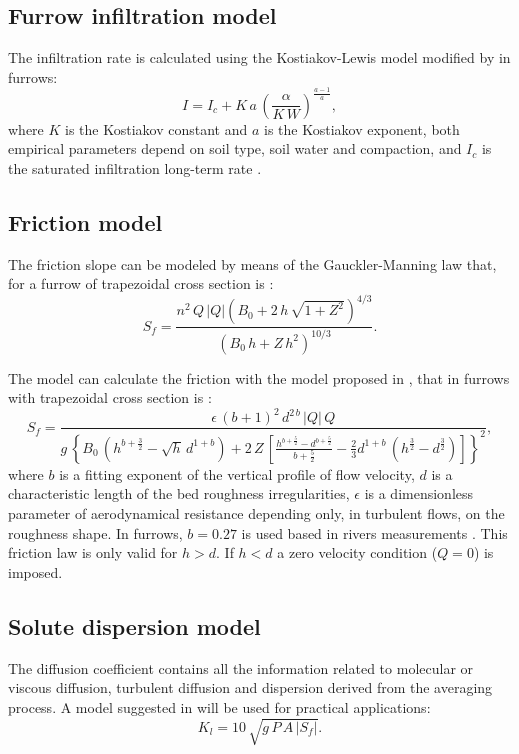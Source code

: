 \documentclass[review,authoryear]{elsarticle}
\newcommand{\eq}[2]{\begin{equation}\label{#2}#1\end{equation}}
\newcommand{\PA}[1] {\left(#1\right)}
\newcommand{\C}[1] {\left[#1\right]}
\newcommand{\LL}[1] {\left\{#1\right\}}
\newcommand{\ABS}[1] {\left|#1\right|}
\begin{document}
\subsection{Furrow infiltration model}

The infiltration rate is calculated using the Kostiakov-Lewis model modified by
\cite{JaviSurcos1} in furrows:
\eq{I=I_c+K\,a\,\PA{\frac{\alpha}{K\,W}}^\frac{a-1}{a},}
{EqKostiakovLewisSurcosi}
where $K$ is the Kostiakov constant and $a$ is the Kostiakov exponent, both
empirical parameters depend on soil type, soil water and compaction, and $I_c$
is the saturated infiltration long-term rate \citep{WalkerSkogerboe87}.

\subsection{Friction model}

The friction slope can be modeled by means of the Gauckler-Manning law
\citep{Gauckler,Manning} that, for a furrow of trapezoidal cross section is
\citep{JaviSurcos1}:
\eq
{
	S_f=\frac{n^2\,Q\,|Q|\PA{B_0+2\,h\,\sqrt{1+Z^2}}^{4/3}}
	{\PA{B_0\,h+Z\,h^2}^{10/3}}.
}{EqManning}

The model can calculate the friction with the model proposed in
\cite{JaviFriccion,JaviFriccion2}, that in furrows with trapezoidal cross
section is \citep{JaviSurcos1}:
\eq
{
	S_f=\frac{\epsilon\,(b+1)^2\,d^{2\,b}\,|Q|\,Q}
	{g\,\LL{B_0\,\PA{h^{b+\frac32}-\sqrt{h}\,d^{1+b}}+
	2\,Z\,\C{\frac{h^{b+\frac52}-d^{b+\frac52}}{b+\frac52}-
	\frac{2}{3}d^{1+b}\,\PA{h^\frac32-d^\frac32}}}^2},
}{EqSf}
where $b$ is a fitting exponent of the vertical profile of flow velocity, $d$ is
a characteristic length of the bed roughness irregularities, $\epsilon$ is a
dimensionless parameter of aerodynamical resistance depending only, in turbulent
flows, on the roughness shape. In furrows, $b=0.27$ is used based in rivers
measurements \citep{JaviFriccion}. This friction law is only valid for $h>d$. If
$h<d$ a zero velocity condition ($Q=0$) is imposed.

\subsection{Solute dispersion model}

The diffusion coefficient contains all the information related to molecular or
viscous diffusion, turbulent diffusion and dispersion derived from the averaging
process. A model suggested in \cite{Rutherford94} will be used for practical
applications:
\eq{K_l=10\,\sqrt{g\,P\,A\,\ABS{S_f}}.}{EqRutherford}
\end{document}
